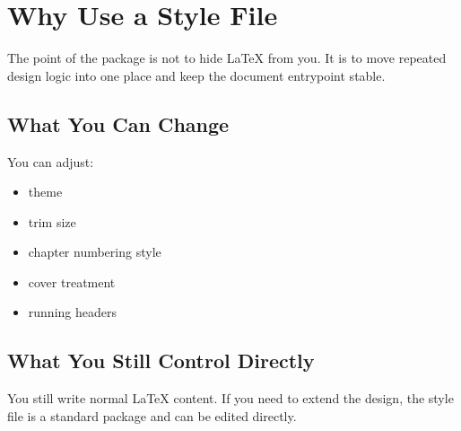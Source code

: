 \chapter{Why Use a Style File}

The point of the package is not to hide LaTeX from you. It is to move repeated
design logic into one place and keep the document entrypoint stable.

\section{What You Can Change}

You can adjust:

\begin{itemize}
  \item theme
  \item trim size
  \item chapter numbering style
  \item cover treatment
  \item running headers
\end{itemize}

\section{What You Still Control Directly}

You still write normal LaTeX content. If you need to extend the design, the
style file is a standard package and can be edited directly.

